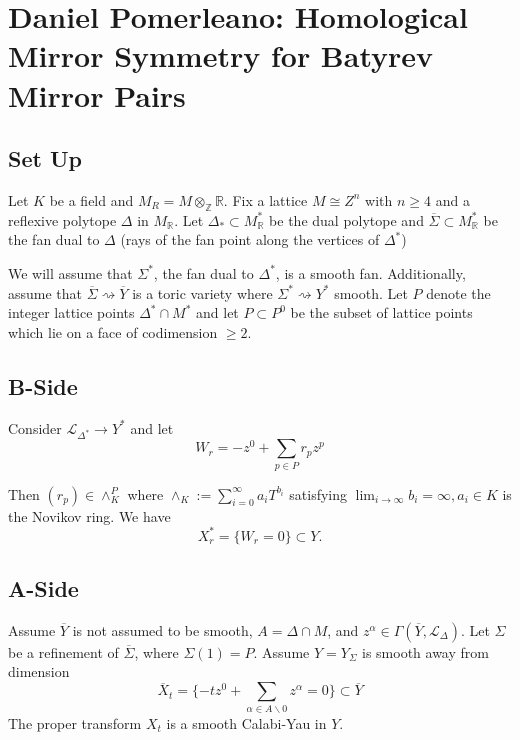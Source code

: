 \chapter{Daniel Pomerleano: Homological Mirror Symmetry for Batyrev Mirror Pairs}
\label{pomerleano}


\section{Set Up}

Let $K$ be a field and $M_R = M\otimes_{\mathbb{Z}} \mathbb{R}$. Fix a lattice $M\cong Z^n$ with $n\ge 4$ and a reflexive polytope $\Delta$ in $M_{\mathbb{R}}$. Let $\Delta_* \subset M_{\mathbb{R}}^*$ be the dual polytope and $\overline{\Sigma} \subset M_{\mathbb{R}}^*$ be the fan dual to $\Delta$ (rays of the fan point along the vertices of $\Delta^*$)

We will assume that $\Sigma^*$, the fan dual to $\Delta^*$, is a smooth fan. Additionally, assume that $\overline{\Sigma} \rightsquigarrow \overline{Y}$ is a toric variety where $\Sigma^* \rightsquigarrow Y^*$ smooth. Let $P$ denote the integer lattice points $\Delta^* \cap M^*$ and let $P\subset P^0$ be the subset of lattice points which lie on a face of codimension $\ge 2$.

\section{B-Side}
Consider $\mathcal{L}_{\Delta^*} \to Y^*$ and let
\[
W_r = - z^0 + \sum_{p\in P} r_pz^p
\]

Then $(r_p) \in \wedge_K^P$ where $\wedge_K:= \sum_{i=0}^\infty a_iT^{b_i}$ satisfying $\lim_{i\to \infty} b_i = \infty, a_i \in K$ is the Novikov ring. We have
\[
X_r^* = \{ W_r =0\}\subset Y.
\]

\section{A-Side}

Assume $\overline{Y}$ is not assumed to be smooth, $A=\Delta\cap M$, and $z^\alpha \in \Gamma(\overline{Y}, \mathcal{L}_\Delta)$. Let $\Sigma$ be a refinement of $\overline{\Sigma}$, where $\Sigma(1)=P$. Assume $Y=Y_\Sigma$ is smooth away from dimension
    \[
        \overline{X}_t = \{ -tz^0 + \sum_{\alpha \in A\backslash 0} z^\alpha =0 \}\subset \overline{Y}
    \]
The proper transform $X_t$ is a smooth Calabi-Yau in $Y$.

